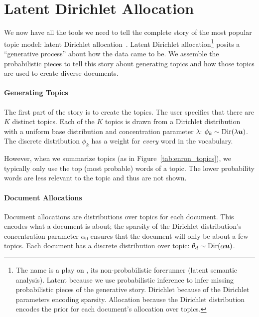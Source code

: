\section{Latent Dirichlet Allocation}
\label{sec:lda}

We now have all the tools we need to tell the complete story of the most popular topic model: latent Dirichlet allocation~\citep[]{blei-03}.  Latent
Dirichlet allocation\footnote{The name  is a play on , its
  non-probabilistic forerunner (latent semantic analysis).  Latent because we
  use probabilistic inference to infer missing probabilistic pieces of the
  generative story.  Dirichlet because of the Dirichlet parameters encoding
  sparsity.  Allocation because the Dirichlet distribution encodes the prior for
  each document's allocation over topics.} posits a ``generative process'' about
how the data came to be.  We assemble the probabilistic pieces to tell
this story about generating topics and how those topics are used to create
diverse documents.

\paragraph{Generating Topics}

The first part of the story is to create the topics.  The user specifies that
there are $K$ distinct topics.  Each of the $K$ topics is drawn from a Dirichlet
distribution with a uniform base distribution and concentration parameter
$\lambda$: $\phi_k \sim \mbox{Dir}(\lambda {\bm u})$.  The discrete distribution
$\phi_k$ has a weight for \emph{every} word in the vocabulary.

However, when we summarize topics (as in
Figure~\ref{tab:enron_topics}), we typically only use the top (most probable) words of
a topic.  The lower probability words are less relevant to the topic
and thus are not shown.

\paragraph{Document Allocations}

Document allocations are distributions over topics for each document.  This
encodes what a document is about; the sparsity of the Dirichlet distribution's
concentration parameter $\alpha_0$ ensures that the document will only be about a
few topics.  Each document has a discrete distribution over topic: $\theta_d \sim
\mbox{Dir}(\alpha {\bm u})$.

